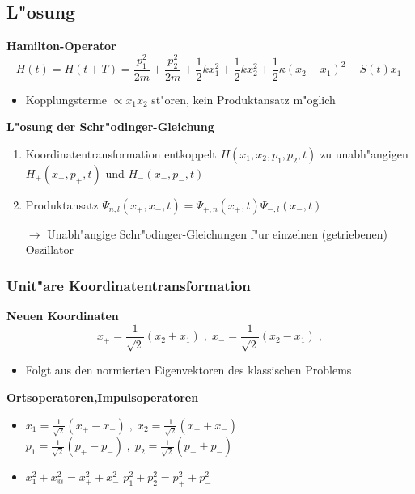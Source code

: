 \subsection{L"osung}
\begin{frame}
  \textbf{Hamilton-Operator}
  \begin{equation}
    H(t) = H(t+T) = \frac{p_1^2}{2m} + \frac{p_2^2}{2m} + \frac 1 2 kx_1^2 + \frac 1 2 kx_2^2 + \frac 1 2 \kappa(x_2-x_1)^2 - S(t)x_1 \;
    \label{H_gekoppelt}
  \end{equation}
  \begin{itemize}
    \item Kopplungsterme $\propto x_1x_2$ st"oren, kein Produktansatz m"oglich
  \end{itemize}

  \textbf{L"osung der Schr"odinger-Gleichung}
  \begin{enumerate}
    \item Koordinatentransformation entkoppelt $H(x_1,x_2,p_1,p_2,t)$ zu unabh"angigen $H_+(x_+,p_+,t)$ und $H_-(x_-,p_-,t)$
    \item Produktansatz $\Psi_{n,l}(x_+,x_-,t)=\Psi_{+,n}(x_+,t)\Psi_{-,l}(x_-,t)$

    $\rightarrow$ Unabh"angige Schr"odinger-Gleichungen f"ur einzelnen (getriebenen) Oszillator
  \end{enumerate}
\end{frame}



\begin{frame}
  \frametitle{Unit"are Koordinatentransformation}
  \textbf{Neuen Koordinaten}
  \begin{equation}
    x_+ = \frac{1}{\sqrt{2}}(x_2+x_1) \;,\; x_-=\frac{1}{\sqrt{2}}(x_2-x_1) \;,
    \label{koord_trafo_x}
  \end{equation}
  \begin{itemize}
    \item Folgt aus den normierten Eigenvektoren des klassischen Problems
  \end{itemize}

  \textbf{Ortsoperatoren,Impulsoperatoren}
  \begin{itemize}
    \item $x_1=\frac{1}{\sqrt{2}}(x_+-x_-) \;,\; x_2=\frac{1}{\sqrt{2}}(x_++x_-)$ $p_1=\frac{1}{\sqrt{2}}(p_+-p_-) \;,\; p_2=\frac{1}{\sqrt{2}}(p_++p_-)$
    \item $x_1^2+x_@^2=x_+^2+x_-^2$ $p_1^2+p_2^2=p_+^2+p_-^2$
  \end{itemize}
\end{frame}

